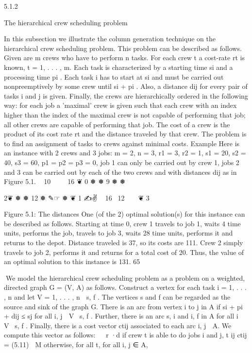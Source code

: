 \documentclass[titlepage]{book}
\theoremstyle{plain}
\theoremstyle{definition}
\theoremstyle{remark}
\begin{document}
5.1.2

The hierarchical crew scheduling problem

In this subsection we illustrate the column generation technique on the hierarchical crew scheduling
problem. This problem can be described as follows. Given are m crews who have to perform n tasks.
For each crew t a cost-rate rt is known, t = 1, . . . , m. Each task is characterized by a starting time si
and a processing time pi . Each task i has to start at si and must be carried out nonpreemptively by
some crew until si + pi . Also, a distance dij for every pair of tasks i and j is given. Finally, the crews are
hierarchically ordered in the following way: for each job a 'maximal' crew is given such that each crew
with an index higher than the index of the maximal crew is not capable of performing that job; all other
crews are capable of performing that job. The cost of a crew is the product of its cost rate rt and the
distance traveled by that crew. The problem is to find an assignment of tasks to crews against minimal
costs.
Example Here is an instance with 2 crews and 3 jobs:
m = 2, n = 3, r1 = 3, r2 = 1, s1 = 20, s2 = 40, s3 = 60, p1 = p2 = p3 = 0,
job 1 can only be carried out by crew 1, jobs 2 and 3 can be carried out by each of the two crews and
with distances dij as in Figure 5.1.
 
10 
 
  16
❦
0
❅
❅
9
❅
❅

2❦
❅
❅ 12
❅ ✎☞
❅ ❦
1
✍✌
 
16  12
 
 
❦
3

Figure 5.1: The distances
One (of the 2) optimal solution(s) for this instance can be described as follows. Starting at time 0, crew
1 travels to job 1, waits 4 time units, performs the job, travels to job 3, waits 28 time units, performs it
and returns to the depot. Distance traveled is 37, so its costs are 111. Crew 2 simply travels to job 2,
performs it and returns for a total cost of 20. Thus, the value of an optimal solution to this instance is
131.
65

We model the hierarchical crew scheduling problem as a problem on a weighted, directed graph G = (V, A)
as follows. Construct a vertex for each task i = 1, . . . , n and let V = {1, . . . , n} ∪ {s, f }. The vertices s
and f can be regarded as the source and sink of the graph G. There is an arc from vertex i to j in A if
si + pi + dij ≤ sj for all i, j ∈ V \ {s, f }. Further, there is an arc {s, i} and {i, f } in A for all i ∈ V \ {s, f }.
Finally, there is a cost vector ctij associated to each arc {i, j} ∈ A. We compute this vector as follows:

 r ·d
if crew t is able to do jobs i and j,
t
ij
ctij =
(5.11)
 M
otherwise, for all t, for all {i, j} ∈ A,
\end{document}
